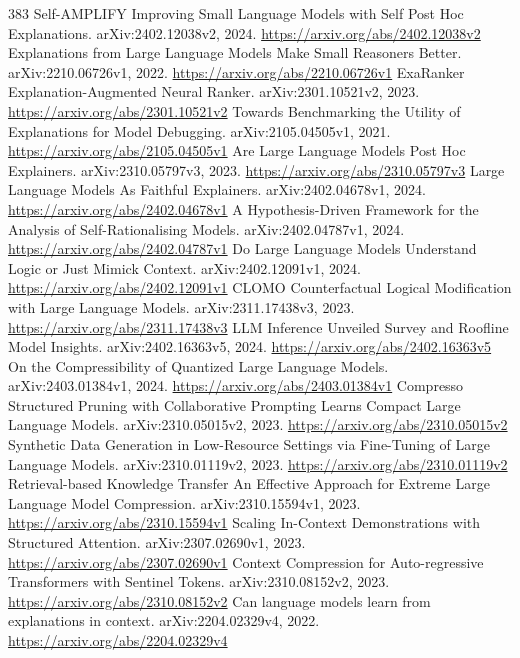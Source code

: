 \documentclass[11pt]{article}
\begin{document}
\begin{thebibliography}{383}
 Self-AMPLIFY Improving Small Language Models with Self Post Hoc Explanations. arXiv:2402.12038v2, 2024. \url{https://arxiv.org/abs/2402.12038v2}
 Explanations from Large Language Models Make Small Reasoners Better. arXiv:2210.06726v1, 2022. \url{https://arxiv.org/abs/2210.06726v1}
 ExaRanker Explanation-Augmented Neural Ranker. arXiv:2301.10521v2, 2023. \url{https://arxiv.org/abs/2301.10521v2}
 Towards Benchmarking the Utility of Explanations for Model Debugging. arXiv:2105.04505v1, 2021. \url{https://arxiv.org/abs/2105.04505v1}
 Are Large Language Models Post Hoc Explainers. arXiv:2310.05797v3, 2023. \url{https://arxiv.org/abs/2310.05797v3}
 Large Language Models As Faithful Explainers. arXiv:2402.04678v1, 2024. \url{https://arxiv.org/abs/2402.04678v1}
 A Hypothesis-Driven Framework for the Analysis of Self-Rationalising Models. arXiv:2402.04787v1, 2024. \url{https://arxiv.org/abs/2402.04787v1}
 Do Large Language Models Understand Logic or Just Mimick Context. arXiv:2402.12091v1, 2024. \url{https://arxiv.org/abs/2402.12091v1}
 CLOMO Counterfactual Logical Modification with Large Language Models. arXiv:2311.17438v3, 2023. \url{https://arxiv.org/abs/2311.17438v3}
 LLM Inference Unveiled Survey and Roofline Model Insights. arXiv:2402.16363v5, 2024. \url{https://arxiv.org/abs/2402.16363v5}
 On the Compressibility of Quantized Large Language Models. arXiv:2403.01384v1, 2024. \url{https://arxiv.org/abs/2403.01384v1}
 Compresso Structured Pruning with Collaborative Prompting Learns Compact Large Language Models. arXiv:2310.05015v2, 2023. \url{https://arxiv.org/abs/2310.05015v2}
 Synthetic Data Generation in Low-Resource Settings via Fine-Tuning of Large Language Models. arXiv:2310.01119v2, 2023. \url{https://arxiv.org/abs/2310.01119v2}
 Retrieval-based Knowledge Transfer An Effective Approach for Extreme Large Language Model Compression. arXiv:2310.15594v1, 2023. \url{https://arxiv.org/abs/2310.15594v1}
 Scaling In-Context Demonstrations with Structured Attention. arXiv:2307.02690v1, 2023. \url{https://arxiv.org/abs/2307.02690v1}
 Context Compression for Auto-regressive Transformers with Sentinel Tokens. arXiv:2310.08152v2, 2023. \url{https://arxiv.org/abs/2310.08152v2}
 Can language models learn from explanations in context. arXiv:2204.02329v4, 2022. \url{https://arxiv.org/abs/2204.02329v4}

\end{thebibliography}
\end{document}
